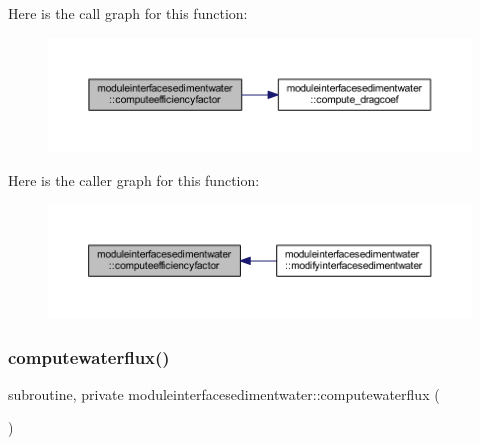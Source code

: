 Here is the call graph for this function\+:\nopagebreak
\begin{figure}[H]
\begin{center}
\leavevmode
\includegraphics[width=350pt]{namespacemoduleinterfacesedimentwater_a0e6b11bab2cf3a9864f9e36970079830_cgraph}
\end{center}
\end{figure}
Here is the caller graph for this function\+:\nopagebreak
\begin{figure}[H]
\begin{center}
\leavevmode
\includegraphics[width=350pt]{namespacemoduleinterfacesedimentwater_a0e6b11bab2cf3a9864f9e36970079830_icgraph}
\end{center}
\end{figure}
\mbox{\label{namespacemoduleinterfacesedimentwater_a53be621f24e2efe413055d68cd165ba9}} 
\subsubsection{\texorpdfstring{computewaterflux()}{computewaterflux()}}
{\footnotesize\ttfamily subroutine, private moduleinterfacesedimentwater\+::computewaterflux (\begin{DoxyParamCaption}{ }\end{DoxyParamCaption})\hspace{0.3cm}{\ttfamily [private]}}

